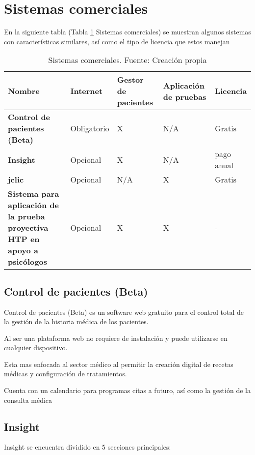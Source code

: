 \section{Sistemas comerciales}

En la siguiente tabla (Tabla \ref{tab:sistemComercial} Sistemas comerciales) se muestran algunos sistemas con características similares, así como el tipo de licencia que estos manejan

\begin{table}[htbp]
    \centering
    \begin{tabular}{ |m{10em}|m{4em}|m{4em}|m{4.5em}|m{3em}| }
    \hline
    Nombre & Internet & Gestor de pacientes & Aplicación de pruebas & Licencia
    \\
    \hline
    \textbf{Control de pacientes (Beta)} & Obligatorio & X & N/A & Gratis
    \\
    \hline
    \textbf{Insight} & Opcional & X & N/A & pago anual
    \\
    \hline
    \textbf{jclic} & Opcional & N/A & X & Gratis
    \\
    \hline
     \textbf{Sistema para aplicación de la prueba proyectiva HTP en apoyo a psicólogos} & Opcional & X & X & -
     \\
     \hline
    \end{tabular}
    \caption{Sistemas comerciales. Fuente: Creación propia}
    \label{tab:sistemComercial}
\end{table}

\newpage
\subsection{Control de pacientes (Beta)}
Control de pacientes (Beta) es un software web gratuito para el control total de la gestión de la historia médica de los pacientes.

Al ser una plataforma web no requiere de instalación y puede utilizarse en cualquier dispositivo.

Esta mas enfocada al sector médico al permitir la creación digital de recetas médicas y configuración de tratamientos.

Cuenta con un calendario para programas citas a futuro, así como la gestión de la consulta médica \cite{ControlPacientes}

\subsection{Insight}
Insight se encuentra dividido en 5 secciones principales:

